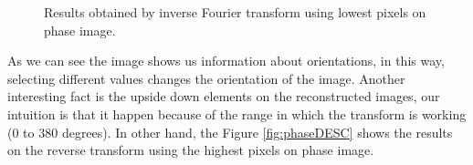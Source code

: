 \documentclass[12pt,a4paper]{article}
\begin{document}
\begin{figure}[!h]
	\quad
	
	\caption{Results obtained by inverse Fourier transform using lowest pixels on phase image.}
	\label{fig:phaseINC}
\end{figure}

As we can see the image shows us information about orientations, in this way, selecting different values changes the orientation of the image. Another interesting fact is the upside down elements on the reconstructed images, our intuition is that it happen because of the range in which the transform is working (0 to 380 degrees). In other hand, the Figure \ref{fig:phaseDESC} shows the results on the reverse transform using the highest pixels on phase image. \\
\end{document}
